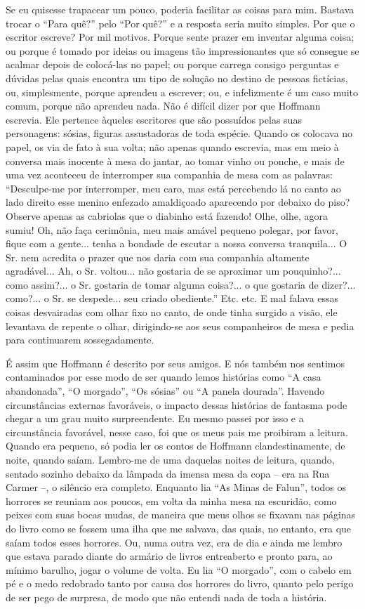 Se eu quisesse trapacear um pouco, poderia facilitar as coisas para mim.
Bastava trocar o ``Para quê?'' pelo ``Por quê?'' e a resposta seria
muito simples. Por que o escritor escreve? Por mil motivos. Porque sente
prazer em inventar alguma coisa; ou porque é tomado por ideias ou
imagens tão impressionantes que só consegue se acalmar depois de
colocá-las no papel; ou porque carrega consigo perguntas e dúvidas pelas
quais encontra um tipo de solução no destino de pessoas fictícias, ou,
simplesmente, porque aprendeu a escrever; ou, e infelizmente é um caso
muito comum, porque não aprendeu nada. Não é difícil dizer por que
Hoffmann escrevia. Ele pertence àqueles escritores que são possuídos
pelas suas personagens: sósias, figuras assustadoras de toda espécie.
Quando os colocava no papel, os via de fato à sua volta; não apenas
quando escrevia, mas em meio à conversa mais inocente à mesa do jantar,
ao tomar vinho ou ponche, e mais de uma vez aconteceu de interromper sua
companhia de mesa com as palavras: ``Desculpe-me por interromper, meu
caro, mas está percebendo lá no canto ao lado direito esse menino
enfezado amaldiçoado aparecendo por debaixo do piso? Observe apenas as
cabriolas que o diabinho está fazendo! Olhe, olhe, agora sumiu! Oh, não
faça cerimônia, meu mais amável pequeno polegar, por favor, fique com a
gente... tenha a bondade de escutar a nossa conversa tranquila... O Sr.
nem acredita o prazer que nos daria com sua companhia altamente
agradável... Ah, o Sr. voltou... não gostaria de se aproximar um
pouquinho?... como assim?... o Sr. gostaria de tomar alguma coisa?... o
que gostaria de dizer?... como?... o Sr. se despede... seu criado
obediente.'' Etc. etc. E mal falava essas coisas desvairadas com olhar
fixo no canto, de onde tinha surgido a visão, ele levantava de repente o
olhar, dirigindo-se aos seus companheiros de mesa e pedia para
continuarem sossegadamente.

É assim que Hoffmann é descrito por seus amigos. E nós também nos
sentimos contaminados por esse modo de ser quando lemos histórias como
``A casa abandonada'', ``O morgado'', ``Os sósias'' ou ``A panela
dourada''. Havendo circunstâncias externas favoráveis, o impacto dessas
histórias de fantasma pode chegar a um grau muito surpreendente. Eu
mesmo passei por isso e a circunstância favorável, nesse caso, foi que
os meus pais me proibiram a leitura. Quando era pequeno, só podia ler os
contos de Hoffmann clandestinamente, de noite, quando saíam. Lembro-me
de uma daquelas noites de leitura, quando, sentado sozinho debaixo da
lâmpada da imensa mesa da copa -- era na Rua Carmer --, o silêncio era
completo. Enquanto lia ``As Minas de Falun'', todos os horrores se
reuniam aos poucos, em volta da minha mesa na escuridão, como peixes com
suas bocas mudas, de maneira que meus olhos se fixavam nas páginas do
livro como se fossem uma ilha que me salvava, das quais, no entanto, era
que saíam todos esses horrores. Ou, numa outra vez, era de dia e ainda
me lembro que estava parado diante do armário de livros entreaberto e
pronto para, ao mínimo barulho, jogar o volume de volta. Eu lia ``O
morgado'', com o cabelo em pé e o medo redobrado tanto por causa dos
horrores do livro, quanto pelo perigo de ser pego de surpresa, de modo
que não entendi nada de toda a história.

